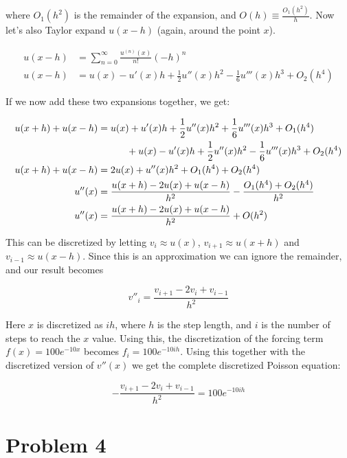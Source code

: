 \documentclass[english,notitlepage]{article}  %
\begin{document}
    where $O_1(h^2)$ is the remainder of the expansion, and $O(h) \equiv
    \frac{O_1(h^2)}{h}$. Now let's also Taylor expand $u(x-h)$ (again, around the
    point $x$).

    \begin{align*}
        u(x-h) &= \sum_{n=0}^{\infty} \frac{u^{(n)}(x)}{n!} (-h)^n
        \\
        u(x-h) &= u(x) - u'(x) h + \frac{1}{2} u''(x) h^2 - \frac{1}{6} u'''(x) h^3 + O_2(h^4)
    \end{align*}

    If we now add these two expansions together, we get:

    \begin{align*}
        u(x+h) + u(x-h) &= u(x) + u'(x) h + \frac{1}{2} u''(x) h^2 + \frac{1}{6} u'''(x) h^3
        + O_1(h^4)
        \\ & \hspace*{30pt} + u(x) - u'(x) h + \frac{1}{2} u''(x) h^2 - \frac{1}{6} u'''(x) h^3 + O_2(h^4)
        \\
        u(x+h) + u(x-h) &= 2u(x) + u''(x) h^2 + O_1(h^4) + O_2(h^4)
        \\
        u''(x) &= \frac{u(x+h) - 2u(x) + u(x-h)}{h^2} - \frac{O_1(h^4) + O_2(h^4)}{h^2}
        \\
        u''(x) &= \frac{u(x+h) - 2u(x) + u(x-h)}{h^2} + O(h^2)
    \end{align*}

    This can be discretized by letting $v_i \approx u(x)$, $v_{i+1} \approx u(x+h)$
    and $v_{i-1} \approx u(x-h)$. Since this is an approximation we can ignore the
    remainder, and our result becomes

    \begin{equation*}
        v''_i = \frac{v_{i+1} - 2v_i + v_{i-1}}{h^2}
    \end{equation*}

    Here $x$ is discretized as $i h$, where $h$ is the step length, and $i$ is the
    number of steps to reach the $x$ value. Using this, the discretization of the
    forcing term $f(x) = 100 e^{-10 x}$ becomes $f_i = 100 e^{-10 ih}$. Using this
    together with the discretized version of $v''(x)$ we get the complete
    discretized Poisson equation:

    \begin{equation}
        -\frac{v_{i+1} - 2v_i + v_{i-1}}{h^2} = 100 e^{-10 i h}
    \end{equation}

\section*{Problem 4}
\end{document}
